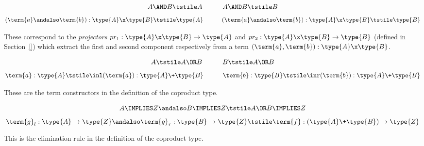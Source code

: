 \begin{Theorem}
\[
A \AND B \tstile A  \quad\quad\quad  A \AND B \tstile B  
\]
\[
(\term{a}\andalso \term{b}): \type{A} \x \type{B} 
\tstile 
\type{A}
  \quad\quad\quad 
(\term{a}\andalso \term{b}): \type{A} \x \type{B} 
\tstile 
\type{B} 
\]
\end{Theorem}
\begin{Proof}
These correspond to the \emph{projectors} 
$pr_1: \type{A} \x \type{B} \to \type{A}$
and
$pr_2: \type{A} \x \type{B} \to \type{B}$
(defined in Section~\ref{}) which extract the first and second component respectively from a term 
$(\term{a}, \term{b}):\type{A} \x \type{B}$.
\end{Proof}


\begin{Theorem}[$\OR$-introduction]
\[
A 
\tstile 
A \OR B  
\quad\quad\quad  
B 
\tstile 
A \OR B  
\]
\[
\term{a}: \type{A}
\tstile 
\inl(\term{a}): \type{A} \+ \type{B} 
  \quad\quad\quad 
\term{b}: \type{B} 
\tstile 
\inr(\term{b}): \type{A} \+ \type{B} 
\]\end{Theorem}
\begin{Proof}
These are the term constructors in the definition of the coproduct type.
\end{Proof}


\begin{Theorem}[$\OR$-elimination]
\[
A \IMPLIES Z\andalso 
B \IMPLIES Z
\tstile
A \OR B \IMPLIES Z
\]
\[
\term{g}_l:\type{A} \to \type{Z}\andalso
\term{g}_r:\type{B} \to \type{Z} 
\tstile
\term{f}:(\type{A} \+ \type{B}) \to \type{Z} 
\]
\end{Theorem}
\begin{Proof}
This is the elimination rule in the definition of the coproduct type.
\end{Proof}


